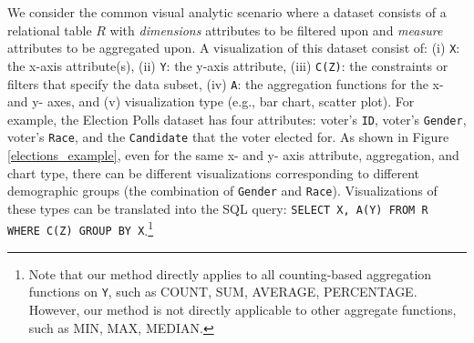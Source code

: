 \npar {} We consider the common visual analytic scenario where a dataset consists of a relational table $R$ with \textit{dimensions} attributes to be filtered upon and \textit{measure} attributes to be aggregated upon. A visualization of this dataset consist of: (i) {\tt X}: the x-axis attribute(s), (ii) {\tt Y}: the y-axis attribute, (iii) {\tt C(Z)}: the constraints or filters that specify the data subset, (iv) {\tt A}: the aggregation functions for the x- and y- axes, and (v) visualization type (e.g., bar chart, scatter plot). For example, the Election Polls dataset has four attributes: voter's {\tt ID}, voter's {\tt Gender}, voter's {\tt Race}, and the {\tt Candidate} that the voter elected for. As shown in Figure \ref{elections_example}, even for the same x- and y- axis attribute, aggregation, and chart type, there can be different visualizations corresponding to different demographic groups (the combination of {\tt Gender} and {\tt Race}). Visualizations of these types can be translated into the \textsc{SQL} query: {\tt SELECT X, A(Y) FROM R WHERE C(Z) GROUP BY X}.\footnote{Note that our method directly applies to all counting-based aggregation functions on {\tt Y}, such as \textsc{COUNT}, \textsc{SUM}, \textsc{AVERAGE}, \textsc{PERCENTAGE}. However, our method is not directly applicable to other aggregate functions, such as \textsc{MIN}, \textsc{MAX}, \textsc{MEDIAN}.} 
